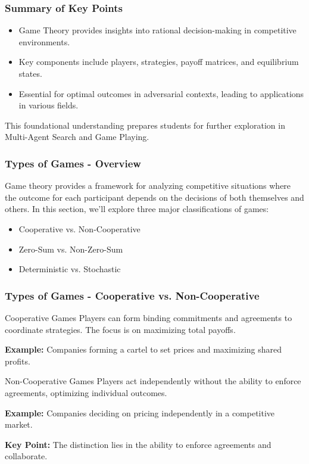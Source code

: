 \documentclass[aspectratio=169]{beamer}
\begin{document}
\begin{frame}[fragile]
    \frametitle{Summary of Key Points}
    \begin{itemize}
        \item Game Theory provides insights into rational decision-making in competitive environments.
        \item Key components include players, strategies, payoff matrices, and equilibrium states.
        \item Essential for optimal outcomes in adversarial contexts, leading to applications in various fields.
    \end{itemize}
    This foundational understanding prepares students for further exploration in Multi-Agent Search and Game Playing.
\end{frame}

\begin{frame}[fragile]
    \frametitle{Types of Games - Overview}
    Game theory provides a framework for analyzing competitive situations where the outcome for each participant depends on the decisions of both themselves and others. 
    In this section, we’ll explore three major classifications of games:
    \begin{itemize}
        \item Cooperative vs. Non-Cooperative
        \item Zero-Sum vs. Non-Zero-Sum
        \item Deterministic vs. Stochastic
    \end{itemize}
\end{frame}

\begin{frame}[fragile]
    \frametitle{Types of Games - Cooperative vs. Non-Cooperative}
    \begin{block}{Cooperative Games}
        Players can form binding commitments and agreements to coordinate strategies. The focus is on maximizing total payoffs.
        
        \textbf{Example:} Companies forming a cartel to set prices and maximizing shared profits.
    \end{block}
    
    \begin{block}{Non-Cooperative Games}
        Players act independently without the ability to enforce agreements, optimizing individual outcomes.
        
        \textbf{Example:} Companies deciding on pricing independently in a competitive market.
    \end{block}

    \textbf{Key Point:} The distinction lies in the ability to enforce agreements and collaborate.
\end{frame}
\end{document}
